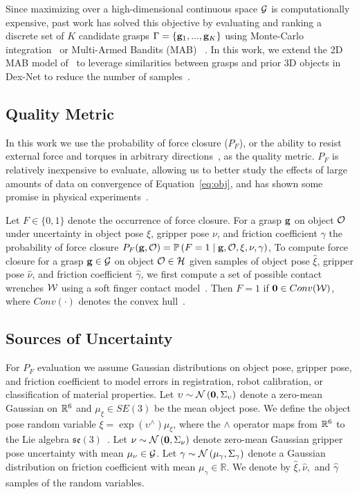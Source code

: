 Since maximizing over a high-dimensional continuous space $\mathcal{G}$ is computationally expensive, past work has solved this objective by evaluating and ranking a discrete set of $K$ candidate grasps $\Gamma = \left\{ \mathbf{g}_1, ..., \mathbf{g}_K \right\}$ using Monte-Carlo integration~\cite{kehoe2012toward, weisz2012pose} or Multi-Armed Bandits (MAB) ~\cite{laskey2015bandits}.
In this work, we extend the 2D MAB model of~\cite{laskey2015bandits} to leverage similarities between grasps and prior 3D objects in Dex-Net to reduce the number of samples~\cite{hoffman2013exploiting, pandey2007multi}.

\subsection{Quality Metric}
In this work we use the probability of force closure ($P_F$), or the ability to resist external force and torques in arbitrary directions~\cite{mahler2015gp}, as the quality metric.
$P_F$ is relatively inexpensive to evaluate, allowing us to better study the effects of large amounts of data on convergence of Equation~\ref{eq:obj}, and has shown some promise in physical experiments~\cite{kim2012physically, weisz2012pose}.

Let $F \in \{0, 1\}$ denote the occurrence of force closure.
For a grasp $\mathbf{g}$ on object $\mathcal{O}$ under uncertainty in object pose $\xi$, gripper pose $\nu$, and friction coefficient $\gamma$ the probability of force closure $P_F(\mathbf{g}, \mathcal{O}) = \mathbb{P}\left(F = 1 \mid \mathbf{g}, \mathcal{O}, \xi, \nu, \gamma \right)$, 
To compute force closure for a grasp $\mathbf{g} \in \mathcal{G}$ on object $\mathcal{O} \in \mathcal{H}$ given samples of object pose $\hat{\xi}$, gripper pose $\hat{\nu}$, and friction coefficient $\hat{\gamma}$, we first compute a set of possible contact wrenches $\mathcal{W}$ using a soft finger contact model~\cite{zheng2005}.
Then $F = 1$ if $\mathbf{0} \in Conv(\mathcal{W})$, where $Conv(\cdot)$ denotes the convex hull~\cite{weisz2012pose}.

\subsection{Sources of Uncertainty}
For $P_F$ evaluation we assume Gaussian distributions on object pose, gripper pose, and friction coefficient to model errors in registration, robot calibration, or classification of material properties. 
Let $\upsilon \sim \mathcal{N}\left(\mathbf{0}, \Sigma_{\upsilon}\right)$ denote a zero-mean Gaussian on $\mathbb{R}^6$ and $\mu_{\xi} \in SE(3)$ be the mean object pose.
We define the object pose random variable $\xi = \exp\left( \upsilon^{\wedge} \right) \mu_{\xi}$, where the $\wedge$ operator maps from $\mathbb{R}^6$ to the Lie algebra $\mathfrak{se}(3)$~\cite{barfoot2014associating}.
Let $\nu \sim \mathcal{N}\left(\mathbf{0}, \Sigma_{\nu}\right)$ denote zero-mean Gaussian gripper pose uncertainty with mean $\mu_{\nu} \in \mathcal{G}$.
Let $\gamma \sim \mathcal{N}\left(\mu_{\gamma}, \Sigma_{\gamma} \right)$ denote a Gaussian distribution on friction coefficient with mean $\mu_{\gamma} \in \mathbb{R}$.
We denote by $\hat{\xi}, \hat{\nu},$ and $\hat{\gamma}$ samples of the random variables.

